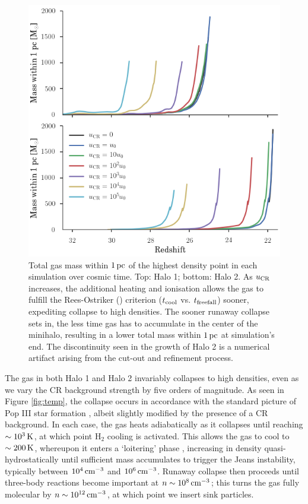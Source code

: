 \documentclass[usenatbib]{mn2e}
\newcommand{\kelvin}{\,{\rm K}}
\newcommand{\cc}{\,{\rm cm}^{-3}}
\newcommand{\pc}{\,{\rm pc}}
\newcommand{\htwo}{\mathrm{H}_2}
\newcommand{\ucr}{{u}_{\rm \small CR}}
\begin{document}
\begin{figure}
\begin{center}
\includegraphics[width=1\columnwidth]{figures/collapse/collapse}
\caption{\label{fig:collapse}
Total gas mass within $1\pc$ of the highest density point in each simulation over cosmic time.
Top: Halo 1; bottom: Halo 2.
As $\ucr$ increases, the additional heating and ionisation allows the gas to fulfill the Rees-Ostriker (\citeyear{ReesOstriker1977}) criterion ($t_{\rm cool}$ vs. $t_{\rm freefall}$) sooner, expediting collapse to high densities.  
The sooner runaway collapse sets in, the less time gas has to accumulate in the center of the minihalo, resulting in a lower total mass within $1\pc$ at simulation's end.
The discontinuity seen in the growth of Halo 2 is a numerical artifact arising from the cut-out and refinement process.%
}
\end{center}
\end{figure}

The gas in both Halo 1 and Halo 2 invariably collapses to high densities, even as we vary the CR background strength by five orders of magnitude. 
As seen in Figure \ref{fig:temp}, the collapse occurs in accordance with the standard picture of Pop III star formation \citep[e.g.,][]{Greifetal2012,StacyBromm2013,Hiranoetal2014,Hosokawaetal2015}, albeit slightly modified by the presence of a CR background.  
In each case, the gas heats adiabatically as it collapses until reaching $\sim10^3\kelvin$, at which point $\htwo$ cooling is activated.  
This allows the gas to cool to $\sim200\kelvin$, whereupon it enters a `loitering' phase \citep{BrommCoppiLarson2002}, increasing in density quasi-hydrostatically until sufficient mass accumulates to trigger the Jeans instability, typically between $10^4\cc$ and $10^6\cc$. 
Runaway collapse then proceeds until three-body reactions become important at $n\sim10^8\cc$; this turns the gas fully molecular by $n\sim10^{12}\cc$, at which point we insert sink particles.
\end{document}
